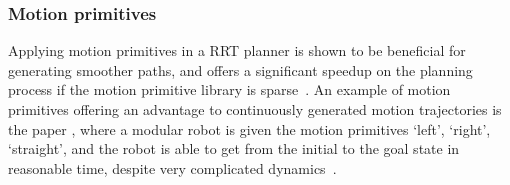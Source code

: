 \subsubsection{Motion primitives}

Applying motion primitives in a \ac{RRT} planner is shown to be beneficial for
generating smoother paths, and offers a significant speedup on the planning
process if the motion primitive library is
sparse~\cite{vonasekGlobalMotionPlanning2013}. An example of motion primitives
offering an advantage to continuously generated motion trajectories is the paper
, where a modular robot is given
the motion primitives `left', `right', `straight', and the robot is able to get
from the initial to the goal state in reasonable time, despite very complicated
dynamics~\cite{vonasekHighlevelMotionPlanning2015}.
